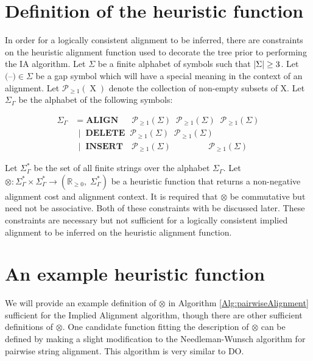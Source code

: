 \documentclass{bmcart}
\newcommand*\NEPowerset{\mathcal{P}_{\geq 1}}
\newcommand*\gap{\textrm{(--)}}
\newcommand*\NonNegReals{\mathbb{R}_{\geq 0}}
\DeclarePairedDelimiter\setsize{\lvert}{\rvert}%
\begin{document}
\section*{Definition of the heuristic function}
In order for a logically consistent alignment to be inferred, there are constraints on the heuristic alignment function used to decorate the tree prior to performing the IA algorithm.
Let $\Sigma$ be a finite alphabet of symbols such that $\setsize{\Sigma} \geq 3$.
Let $\gap \in \Sigma$ be a gap symbol which will have a special meaning in the context of an alignment.
Let $\NEPowerset (\operatorname{X})$ denote the collection of non-empty subsets of $\mathrm{X}$.
Let $\Sigma_{\Gamma}$ be the alphabet of the following symbols:

\begin{align*}
  \Sigma_{\Gamma} &      = \textbf{ALIGN}  \;\;\;\;\;\,  \NEPowerset (\Sigma) \;\; \NEPowerset (\Sigma) \;\; \NEPowerset (\Sigma)
\\                & \;\, | \;\; \textbf{DELETE} \;\;     \NEPowerset (\Sigma) \;\; \NEPowerset (\Sigma)
\\                & \;\, | \;\; \textbf{INSERT} \;\;\;\, \NEPowerset (\Sigma) \;\; \quad\quad\quad\;         \;\; \NEPowerset (\Sigma)
\end{align*}

Let $\Sigma^{*}_{\Gamma}$ be the set of all finite strings over the alphabet $\Sigma_{\Gamma}$.
Let $\otimes : \Sigma^{*}_{\Gamma} \times \Sigma^{*}_{\Gamma} \rightarrow \left(\NonNegReals,\; \Sigma^{*}_{\Gamma}\right)$ be a heuristic function that returns a non-negative alignment cost and alignment context.
It is required that $\otimes$ be commutative but need not be associative.
Both of these constraints with be discussed later.
These constraints are necessary but not sufficient for a logically consistent implied alignment to be inferred on the heuristic alignment function.

\section*{An example heuristic function}
We will provide an example definition of $\otimes$ in Algorithm \ref{Alg:pairwiseAlignment} sufficient for the Implied Alignment algorithm, though there are other sufficient definitions of $\otimes$.
One candidate function fitting the description of $\otimes$ can be defined by making a slight modification to the Needleman-Wunsch \citep{Needleman1970} algorithm for pairwise string alignment.
This algorithm is very similar to DO.
\end{document}
